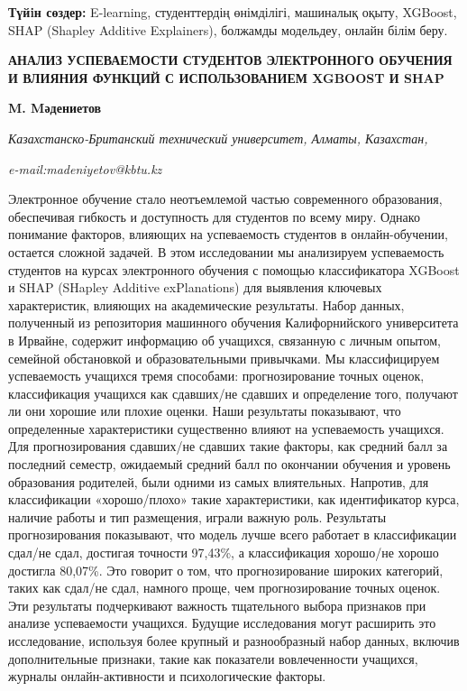 {\bfseries Түйiн сөздер:} E-learning, студенттердің өнімділігі, машиналық
оқыту, XGBoost, SHAP (Shapley Additive Explainers), болжамды модельдеу,
онлайн білім беру.

\begin{articleheader}
{\bfseries АНАЛИЗ УСПЕВАЕМОСТИ СТУДЕНТОВ ЭЛЕКТРОННОГО ОБУЧЕНИЯ И ВЛИЯНИЯ ФУНКЦИЙ С ИСПОЛЬЗОВАНИЕМ XGBOOST И SHAP}

{\bfseries M. Mәдениетов}
\end{articleheader}

\begin{affiliation}
\emph{Казахстанско-Британский технический университет, Алматы, Казахстан,}

\emph{e-mail:madeniyetov@kbtu.kz}
\end{affiliation}

Электронное обучение стало неотъемлемой частью современного образования,
обеспечивая гибкость и доступность для студентов по всему миру. Однако
понимание факторов, влияющих на успеваемость студентов в
онлайн-обучении, остается сложной задачей. В этом исследовании мы
анализируем успеваемость студентов на курсах электронного обучения с
помощью классификатора XGBoost и SHAP (SHapley Additive exPlanations)
для выявления ключевых характеристик, влияющих на академические
результаты. Набор данных, полученный из репозитория машинного обучения
Калифорнийского университета в Ирвайне, содержит информацию об учащихся,
связанную с личным опытом, семейной обстановкой и образовательными
привычками. Мы классифицируем успеваемость учащихся тремя способами:
прогнозирование точных оценок, классификация учащихся как сдавших/не
сдавших и определение того, получают ли они хорошие или плохие оценки.
Наши результаты показывают, что определенные характеристики существенно
влияют на успеваемость учащихся. Для прогнозирования сдавших/не сдавших
такие факторы, как средний балл за последний семестр, ожидаемый средний
балл по окончании обучения и уровень образования родителей, были одними
из самых влиятельных. Напротив, для классификации «хорошо/плохо» такие
характеристики, как идентификатор курса, наличие работы и тип
размещения, играли важную роль. Результаты прогнозирования показывают,
что модель лучше всего работает в классификации сдал/не сдал, достигая
точности 97,43\%, а классификация хорошо/не хорошо достигла 80,07\%. Это
говорит о том, что прогнозирование широких категорий, таких как сдал/не
сдал, намного проще, чем прогнозирование точных оценок. Эти результаты
подчеркивают важность тщательного выбора признаков при анализе
успеваемости учащихся. Будущие исследования могут расширить это
исследование, используя более крупный и разнообразный набор данных,
включив дополнительные признаки, такие как показатели вовлеченности
учащихся, журналы онлайн-активности и психологические факторы.


